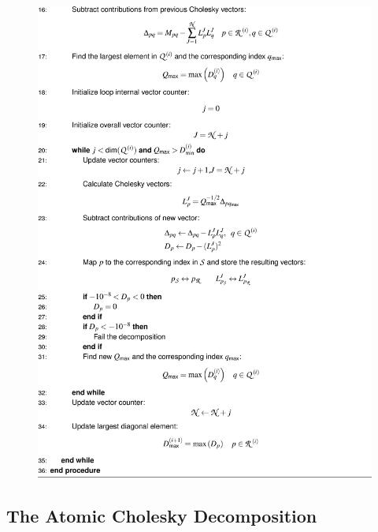\begin{figure}
	\includegraphics[width=\textwidth]{cholesky/algorithm2_2.png}
\end{figure}



\subsection{The Atomic Cholesky Decomposition}


